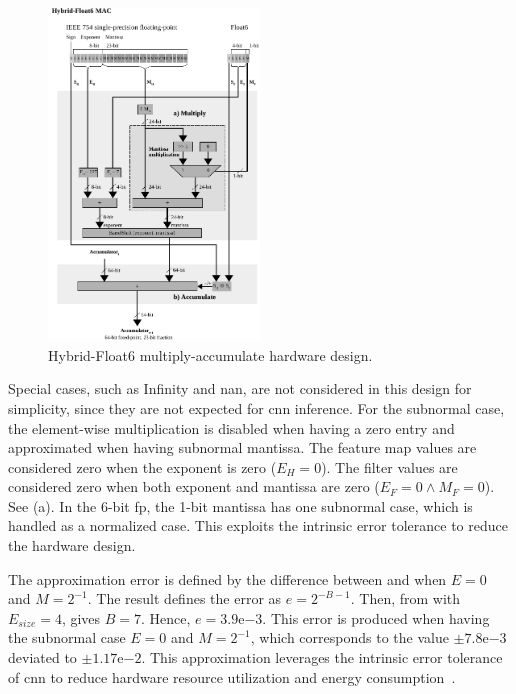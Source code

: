 \begin{figure}[h!]
	\centering
	\includegraphics[width=0.5\textwidth]{./chapters/cnn_accelerator/figures/multiplier.pdf}
	\caption{Hybrid-Float6 multiply-accumulate hardware design.}
	\label{fig:multiplier}
\end{figure}

Special cases, such as Infinity and \gls{nan}, are not considered in this design for simplicity, since they are not expected for \gls{cnn} inference. For the subnormal case, the element-wise multiplication is disabled when having a zero entry and approximated when having subnormal mantissa. The feature map values are considered zero when the exponent is zero ($E_H=0$). The filter values are considered zero when both exponent and mantissa are zero ($E_F=0\land M_F=0$). See (a). In the 6-bit \gls{fp}, the 1-bit mantissa has one subnormal case, which is handled as a normalized case. This exploits the intrinsic error tolerance to reduce the hardware design.

The approximation error is defined by the difference between  and  when $E=0$ and $M=2^{-1}$. The result defines the error as $e=2^{-B-1}$. Then, from  with $E_{size}=4$, gives $B=7$. Hence, $e=3.9\mathrm{e}{-3}$. This error is produced when having the subnormal case $E=0$ and $M=2^{-1}$, which corresponds to the value $\pm7.8\mathrm{e}{-3}$ deviated to $\pm1.17\mathrm{e}{-2}$. This approximation leverages the intrinsic error tolerance of \gls{cnn} to reduce hardware resource utilization and energy consumption~\cite{du2014leveraging}.


